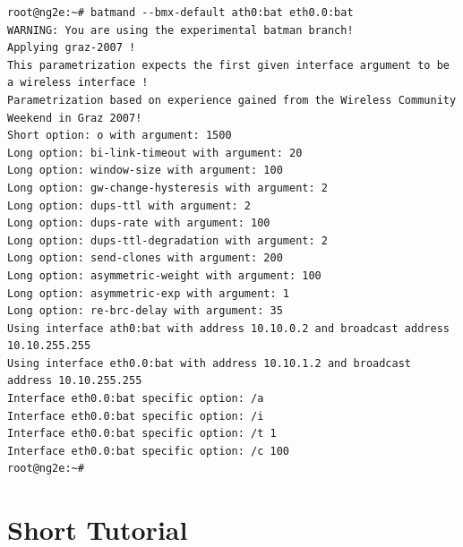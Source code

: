 \documentclass[11pt]{article}
\begin{document}
\begin{small} \begin{verbatim}
root@ng2e:~# batmand --bmx-default ath0:bat eth0.0:bat
WARNING: You are using the experimental batman branch!
Applying graz-2007 !
This parametrization expects the first given interface argument to be a wireless interface !
Parametrization based on experience gained from the Wireless Community Weekend in Graz 2007!
Short option: o with argument: 1500
Long option: bi-link-timeout with argument: 20
Long option: window-size with argument: 100
Long option: gw-change-hysteresis with argument: 2
Long option: dups-ttl with argument: 2
Long option: dups-rate with argument: 100
Long option: dups-ttl-degradation with argument: 2
Long option: send-clones with argument: 200
Long option: asymmetric-weight with argument: 100
Long option: asymmetric-exp with argument: 1
Long option: re-brc-delay with argument: 35
Using interface ath0:bat with address 10.10.0.2 and broadcast address 10.10.255.255
Using interface eth0.0:bat with address 10.10.1.2 and broadcast address 10.10.255.255
Interface eth0.0:bat specific option: /a
Interface eth0.0:bat specific option: /i
Interface eth0.0:bat specific option: /t 1
Interface eth0.0:bat specific option: /c 100
root@ng2e:~#
\end{verbatim} \end{small}






\section{Short Tutorial}
\label{sec:howto}

\label{sec:howto-basics}
\end{document}

